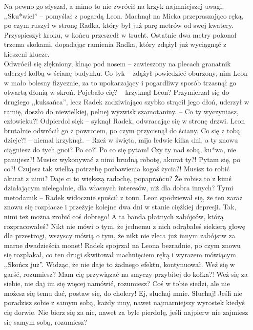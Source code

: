 \documentclass[../MAIN.tex]{subfiles}
\begin{document}
Na pewno go słyszał, a mimo to nie zwrócił na krzyk najmniejszej uwagi.\\
,,Sku*wiel'' -- pomyślał z pogardą Leon. Machnął na Micka przepraszająco ręką, po czym ruszył w stronę Radka, który był już parę metrów od swej kwatery. Przyspieszył kroku, w końcu przeszedł w trucht. Ostatnie dwa metry pokonał trzema skokami, dopadając ramienia Radka, który zdążył już wyciągnąć z kieszeni klucze.\\
Odwrócił się zlękniony, klnąc pod nosem -- zawieszony na plecach granatnik uderzył kolbą w ścianę budynku.
\sx Co ty\3k -- zdążył powiedzieć oburzony, nim Leon w mało bolesny fizycznie, za to upokarzający i pogardliwy sposób trzasnął go otwartą dłonią w skroń.
\xx Pojebało cię? -- krzyknął Leon? Przymierzał się do drugiego ,,kuksańca'', lecz Radek zadziwiająco szybko strącił jego dłoń, uderzył w ramię, doszło do niewielkiej, pełnej wyzwisk szamotaniny. -- Co ty wyczyniasz, człowieku?!
\xx Odpierdol się\3k -- syknął Radek, odwracając się w stronę drzwi. Leon brutalnie odwrócił go z powrotem, po czym przycisnął do ściany.
\xx Co się z tobą dzieje?! -- niemal krzyknął. -- Rzeź w święta, mija ledwie kilka dni, a ty znowu ciągniesz do tych gnoi? Po co?! Po co się pytam! Czy ty nad sobą, ku*wa, nie panujesz?! Musisz wykonywać z nimi brudną robotę, akurat ty?! Pytam się, po co?! Czujesz tak wielką potrzebę pozbawienia kogoś życia?! Musisz to robić akurat z nimi? Daje ci to większą radochę, popaprańcu? Że robisz to z kimś działającym nielegalnie, dla własnych interesów, niż dla dobra innych?
\xx Tymi metodami\3k -- Radek widocznie spuścił z tonu. Leon spodziewał się, że ten zaraz znowu się rozpłacze i przeżyje kolejne dwa dni w stanie ciężkiej depresji.
\xx Tak, nimi też można zrobić coś dobrego! A ta banda płatnych zabójców, którą rozpracowałeś? Nikt nie mówi o tym, że jednemu z nich odrąbałeś siekierą głowę dla przestrogi, wszyscy mówią o tym, że nikt nie zleca już innym zabójstw za marne dwadzieścia monet!
\qd
Radek spojrzał na Leona bezradnie, po czym znowu się rozpłakał, co ten drugi skwitował machnięciem ręką i wyrazem mówiącym ,,Skończ już''. Widząc, że nie daje to żadnego efektu, kontynuował.
\sx Weź się w garść, rozumiesz? Mam cię przywiązać na smyczy przybitej do kołka?! Weź się za siebie, nie daj im się więcej namówić, rozumiesz? Coś w tobie siedzi, ale nie możesz się temu dać, postaw się, do cholery! Ej, słuchaj mnie. Słuchaj! Jeśli nie poradzisz sobie z samym sobą, każdy inny, nawet najmarniejszy wyrostek kiedyś cię dorwie. Nie bierz się za nic, nawet za byle pierdołę, jeśli najpierw nie zajmiesz się samym sobą, rozumiesz?
\end{document}
